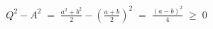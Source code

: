 \documentclass[preview]{standalone}
\begin{document}
\begin{align*}
Q^2 - A^2 \;=\; \tfrac{a^2+b^2}{2} - \left(\tfrac{a+b}{2}\right)^{\!2}\;=\; \tfrac{(a-b)^2}{4} \;\ge\; 0
\end{align*}
\end{document}
